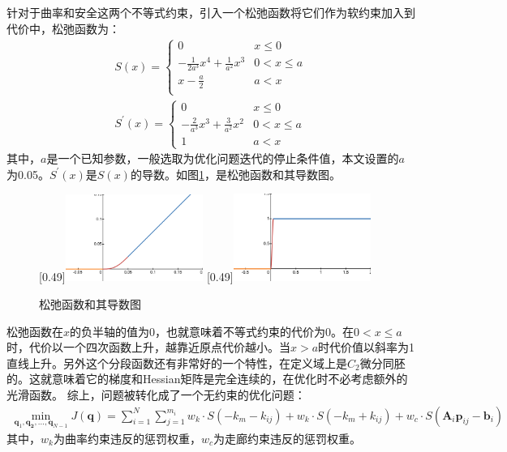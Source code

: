 \documentclass[master,academic]{ysuthesis} %
\begin{document}
		针对于曲率和安全这两个不等式约束，引入一个松弛函数将它们作为软约束加入到代价中，松弛函数为：
		\begin{equation}
			\begin{aligned}
				S( x ) =\left\{ \begin{matrix}
					0&		x\le 0\\
					-\frac{1}{2a^3}x^4+\frac{1}{a^2}x^3&		0<x\le a\\
					x-\frac{a}{2}&		a<x\\
				\end{matrix} \right.  \\
					S^{'}(x) = \left\{\begin{matrix}
					0& x\le0 \\
					-\frac{2}{a^3}x^3+\frac{3}{a^2}x^2& 0 < x \le a \\
					1& a < x
				\end{matrix}\right.
			\end{aligned}
			\label{eq:松弛函数}
		\end{equation}
		其中，$a$是一个已知参数，一般选取为优化问题迭代的停止条件值，本文设置的$a$为0.05。$S^{'}(x)$是$S(x)$的导数。如图\ref{fig:松弛函数图}，是松弛函数和其导数图。
		\begin{figure}[H]
			\centering
			[0.49\textwidth]{\includegraphics[width=0.4\textwidth]{松弛函数.png}}
			[0.49\textwidth]{\includegraphics[width=0.4\textwidth]{松弛导数.png}}
			\caption{松弛函数和其导数图}
			\label{fig:松弛函数图}
		\end{figure}

		松弛函数在$x$的负半轴的值为0，也就意味着不等式约束的代价为0。在$0<x \le a$时，代价以一个四次函数上升，越靠近原点代价越小。当$x>a$时代价值以斜率为1直线上升。另外这个分段函数还有非常好的一个特性，在定义域上是$C_2$微分同胚的。这就意味着它的梯度和Hessian矩阵是完全连续的，在优化时不必考虑额外的光滑函数。
		综上，问题被转化成了一个无约束的优化问题：
		\begin{equation}
			\begin{aligned}
				\min_{\bm{q}_1,\bm{q_2},...,\bm{q}_{N-1}}  J( \bm{q} ) = \sum_{i=1}^N{\sum_{j=1}^{m_i}w_k\cdot{S( -k_m-k_{ij} ) +w_k\cdot S( -k_m+k_{ij} ) +w_c\cdot S( \bm{A}_i\bm{p}_{ij}-\bm{b}_{i})}}
			\end{aligned}
			\label{eq:单阶无约束优化代价}
		\end{equation}
		其中，$w_k$为曲率约束违反的惩罚权重，$w_c$为走廊约束违反的惩罚权重。
\end{document}

